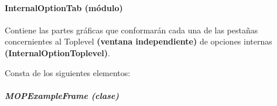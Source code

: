 \documentclass[letterpaper,10pt,english]{sphinxmanual}
\begin{document}
\paragraph{InternalOptionTab (módulo)}
\label{View/Additional/MenuInternalOption/InternalOptionTab/InternalOptionTab:internaloptiontab-modulo}\label{View/Additional/MenuInternalOption/InternalOptionTab/InternalOptionTab::doc}
Contiene las partes gráficas que conformarán cada una de las pestañas
concernientes al Toplevel \textbf{(ventana independiente)} de opciones internas
\textbf{(InternalOptionToplevel)}.

Consta de los siguientes elementos:


\subparagraph{MOPExampleFrame (clase)}
\label{View/Additional/MenuInternalOption/InternalOptionTab/MOPExampleFrame:module-View.Additional.MenuInternalOption.InternalOptionTab.MOPExampleFrame}\label{View/Additional/MenuInternalOption/InternalOptionTab/MOPExampleFrame::doc}\label{View/Additional/MenuInternalOption/InternalOptionTab/MOPExampleFrame:mopexampleframe-clase}
\end{document}
